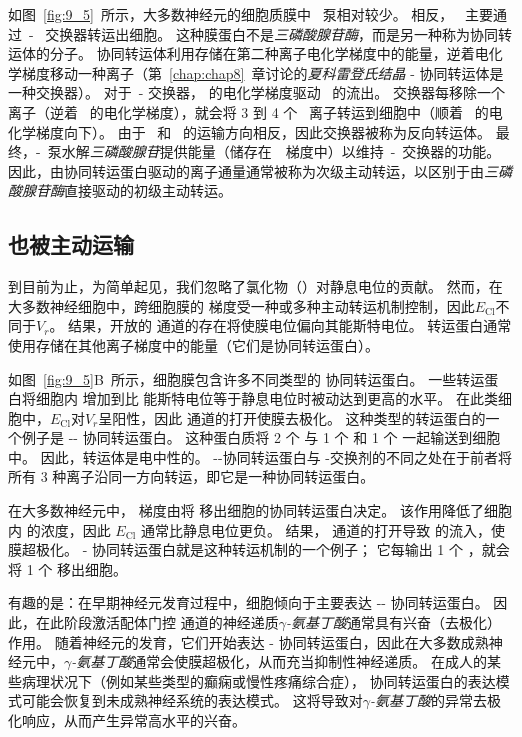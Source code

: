 如图~\ref{fig:9_5}~所示，大多数神经元的细胞质膜中~ 泵相对较少。
相反，~ 主要通过~-~ 交换器转运出细胞。
这种膜蛋白不是\textit{三磷酸腺苷酶}，而是另一种称为协同转运体的分子。
协同转运体利用存储在第二种离子电化学梯度中的能量，逆着电化学梯度移动一种离子（第~\ref{chap:chap8}~章讨论的\textit{夏科雷登氏结晶} - 协同转运体是一种交换器）。
对于~- 交换器， 的电化学梯度驱动~ 的流出。
交换器每移除一个~ 离子（逆着~ 的电化学梯度），就会将 3 到 4 个~ 离子转运到细胞中（顺着~ 的电化学梯度向下）。
由于~ 和~ 的运输方向相反，因此交换器被称为反向转运体。
最终，-~泵水解\textit{三磷酸腺苷}提供能量（储存在~~梯度中）以维持~-~交换器的功能。
因此，由协同转运蛋白驱动的离子通量通常被称为次级主动转运，以区别于由\textit{三磷酸腺苷酶}直接驱动的初级主动转运。



\subsection{ 也被主动运输}
到目前为止，为简单起见，我们忽略了氯化物（）对静息电位的贡献。
然而，在大多数神经细胞中，跨细胞膜的  梯度受一种或多种主动转运机制控制，因此$E_\text{Cl}$不同于$V_r$。
结果，开放的  通道的存在将使膜电位偏向其能斯特电位。
 转运蛋白通常使用存储在其他离子梯度中的能量（它们是协同转运蛋白）。


如图~\ref{fig:9_5}B~所示，细胞膜包含许多不同类型的  协同转运蛋白。
一些转运蛋白将细胞内  增加到比  能斯特电位等于静息电位时被动达到更高的水平。
在此类细胞中，$E_\text{Cl}$对$V_r$呈阳性，因此  通道的打开使膜去极化。
这种类型的转运蛋白的一个例子是 -- 协同转运蛋白。
这种蛋白质将 2 个  与 1 个  和 1 个  一起输送到细胞中。
因此，转运体是电中性的。
--协同转运蛋白与 -交换剂的不同之处在于前者将所有 3 种离子沿同一方向转运，即它是一种协同转运蛋白。


在大多数神经元中， 梯度由将  移出细胞的协同转运蛋白决定。
该作用降低了细胞内  的浓度，因此 $E_\text{Cl}$ 通常比静息电位更负。
结果， 通道的打开导致  的流入，使膜超极化。
- 协同转运蛋白就是这种转运机制的一个例子；
它每输出 1 个 ，就会将 1 个  移出细胞。


有趣的是：在早期神经元发育过程中，细胞倾向于主要表达 -- 协同转运蛋白。
因此，在此阶段激活配体门控  通道的神经递质\textit{$\gamma$-氨基丁酸}通常具有兴奋（去极化）作用。 
随着神经元的发育，它们开始表达 - 协同转运蛋白，因此在大多数成熟神经元中，\textit{$\gamma$-氨基丁酸}通常会使膜超极化，从而充当抑制性神经递质。 
在成人的某些病理状况下（例如某些类型的癫痫或慢性疼痛综合症）， 协同转运蛋白的表达模式可能会恢复到未成熟神经系统的表达模式。
这将导致对\textit{$\gamma$-氨基丁酸}的异常去极化响应，从而产生异常高水平的兴奋。



